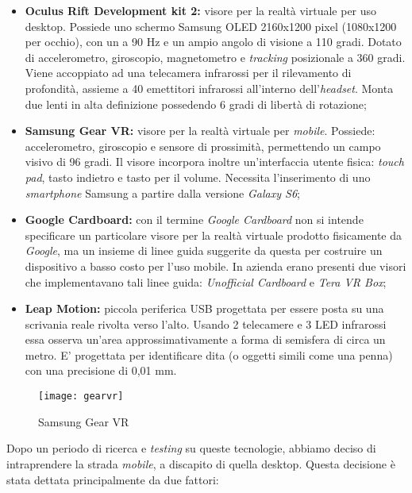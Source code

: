 \begin{itemize}
	\item \textbf{Oculus Rift Development kit 2:} visore per la realtà virtuale per uso desktop. Possiede uno schermo Samsung OLED 2160x1200 pixel (1080x1200 per occhio), con un  a 90 Hz e un ampio angolo di visione a 110 gradi. Dotato di accelerometro, giroscopio, magnetometro e \textit{tracking} posizionale a 360 gradi. Viene accoppiato ad una telecamera infrarossi per il rilevamento di profondità, assieme a 40 emettitori infrarossi all'interno dell'\textit{headset}. Monta due lenti in alta definizione possedendo 6 gradi di libertà di rotazione;
	
	\item \textbf{Samsung Gear VR:} visore per la realtà virtuale per \textit{mobile}. Possiede: accelerometro, giroscopio e sensore di prossimità, permettendo un campo visivo di 96 gradi. Il visore incorpora inoltre un'interfaccia utente fisica: \textit{touch pad}, tasto indietro e tasto per il volume. Necessita l'inserimento di uno \textit{smartphone} Samsung a partire dalla versione \textit{Galaxy S6};
	
	\item \textbf{Google Cardboard:} con il termine \textit{Google Cardboard} non si intende specificare un particolare visore per la realtà virtuale prodotto fisicamente da \textit{Google}, ma un insieme di linee guida suggerite da questa per costruire un dispositivo a basso costo per l'uso mobile. In azienda erano presenti due visori che implementavano tali linee guida: \textit{Unofficial Cardboard} e \textit{Tera VR Box};
	
	\item \textbf{Leap Motion:} piccola periferica USB  progettata per essere posta su una scrivania reale rivolta verso l'alto. Usando 2 telecamere e 3 LED infrarossi essa osserva un'area approssimativamente a forma di semisfera di circa un metro. E' progettata per identificare dita (o oggetti simili come una penna) con una precisione di 0,01 mm. 
\end{itemize}

\label{Gear VR}
\begin{figure}[ht]
	\begin{center}
		\texttt{[image: gearvr]}
		\caption{Samsung Gear VR}
	\end{center}
\end{figure}
\FloatBarrier

Dopo un periodo di ricerca e \textit{testing} su queste tecnologie, abbiamo deciso di intraprendere la strada \textit{mobile}, a discapito di quella desktop. Questa decisione è stata dettata principalmente da due fattori:

